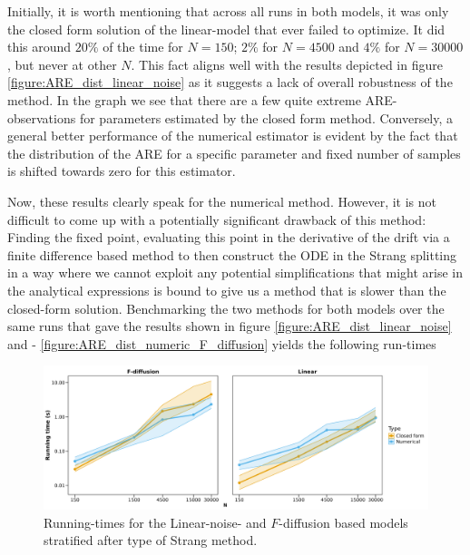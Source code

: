 Initially, it is worth mentioning that across all runs in both models, it was only the closed form solution of the linear-model that ever failed to optimize. It did this around $20\%$ of the time for $N = 150$; $2\%$ for $N = 4500$ and $4\%$ for $N = 30000$, but never at other $N$. This fact aligns well with the results depicted in figure \ref{figure:ARE_dist_linear_noise} as it suggests a lack of overall robustness of the method. In the graph we see that there are a few quite extreme ARE-observations for parameters estimated by the closed form method. Conversely, a general better performance of the numerical estimator is evident by the fact that the distribution of the ARE for a specific parameter and fixed number of samples is shifted towards zero for this estimator. 

Now, these results clearly speak for the numerical method. However, it is not difficult to come up with a potentially significant drawback of this method: Finding the fixed point, evaluating this point in the derivative of the drift via a finite difference based method to then construct the ODE in the Strang splitting in a way where we cannot exploit any potential simplifications that might arise in the analytical expressions is bound to give us a method that is slower than the closed-form solution. Benchmarking the two methods for both models over the same runs that gave the results shown in figure \ref{figure:ARE_dist_linear_noise} and - \ref{figure:ARE_dist_numeric_F_diffusion} yields the following run-times
\begin{figure}[h!]
    \begin{center}
    \includegraphics[scale = .09]{figures/Running_result_numeric.jpeg}
    \caption{Running-times for the Linear-noise- and $F$-diffusion based models stratified after type of Strang method.} 
    \label{figure:running_result_numeric}       
    \end{center}
\end{figure}\\
